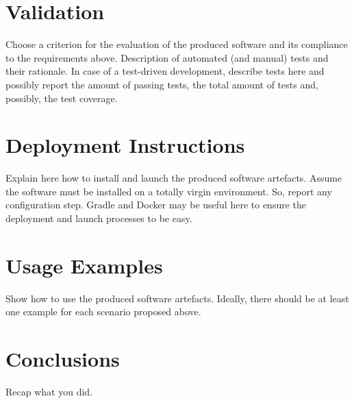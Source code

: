 \chapter{Validation}
Choose a criterion for the evaluation of the produced software and its compliance
to the requirements above. Description of automated (and manual) tests and their
rationale. In case of a test-driven development, describe tests here and possibly report
the amount of passing tests, the total amount of tests and, possibly, the test coverage.

\chapter{Deployment Instructions}
Explain here how to install and launch the produced software artefacts. Assume the
software must be installed on a totally virgin environment. So, report any configuration
step. Gradle and Docker may be useful here to ensure the deployment and launch
processes to be easy.

\chapter{Usage Examples}
Show how to use the produced software artefacts. Ideally, there should be at least one
example for each scenario proposed above.
\chapter{Conclusions}
Recap what you did.